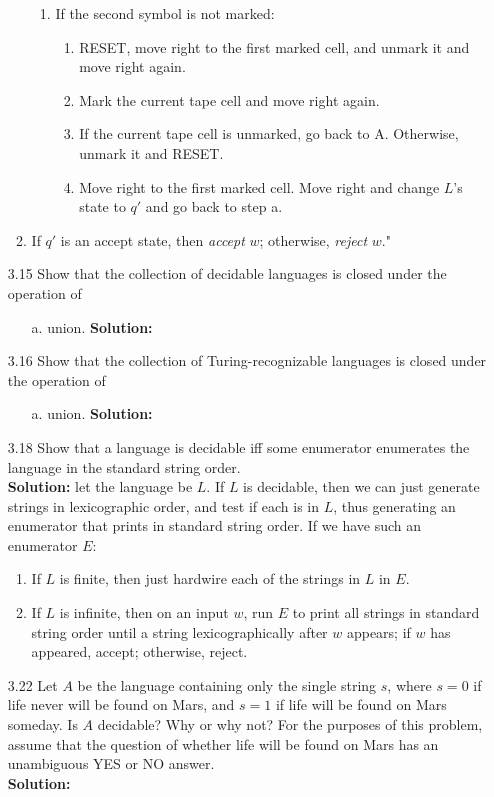 \begin{enumerate}
\begin{enumerate}
\begin{enumerate}
\item If the second symbol is not marked:
\begin{enumerate}
\item RESET, move right to the first marked cell, and unmark it and move right again.
\item Mark the current tape cell and move right again.
\item If the current tape cell is unmarked, go back to A. Otherwise, unmark it and RESET.
\item Move right to the first marked cell. Move right and change $L$'s state to $q'$ and go back to step a.
\end{enumerate}
\end{enumerate}
\item If $q'$ is an accept state, then \emph{accept} $w$; otherwise, \emph{reject} $w$."
\end{enumerate}

\item[3.15]Show that the collection of decidable languages is closed under the operation of
\begin{enumerate}
\item[a.]union. \textbf{Solution:} \alreadyanswered
\end{enumerate}

\item[3.16]Show that the collection of Turing-recognizable languages is closed under the operation of
\begin{enumerate}
\item[a.]union. \textbf{Solution:} \alreadyanswered
\end{enumerate}

\item[3.18]Show that a language is decidable iff some enumerator enumerates the language in the standard string order.
\\
\textbf{Solution:} let the language be $L$. If $L$ is decidable, then we can just generate strings in lexicographic order, and test if each is in $L$, thus generating an enumerator that prints in standard string order. If we have such an enumerator $E$:
\begin{enumerate}
\item If $L$ is finite, then just hardwire each of the strings in $L$ in $E$.
\item If $L$ is infinite, then on an input $w$, run $E$ to print all strings in standard string order until a string lexicographically after $w$ appears; if $w$ has appeared, accept; otherwise, reject.
\end{enumerate}

\item[3.22]Let $A$ be the language containing only the single string $s$, where $s = 0$ if life never will be found on Mars, and $s = 1$ if life will be found on Mars someday. Is $A$ decidable? Why or why not? For the purposes of this problem, assume that the question of whether life will be found on Mars has an unambiguous YES or NO answer.
\\
\textbf{Solution:} \alreadyanswered

\end{enumerate}